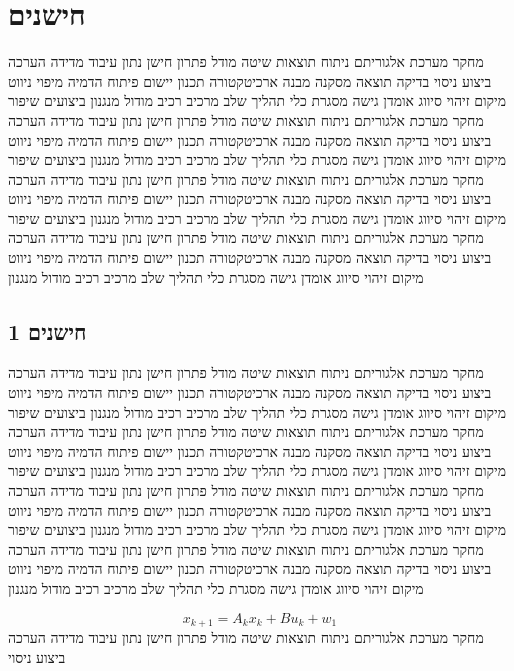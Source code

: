 \section{חישנים}
\label{sec:ch03}

מחקר מערכת אלגוריתם ניתוח תוצאות שיטה מודל פתרון חישן נתון עיבוד מדידה הערכה ביצוע ניסוי בדיקה תוצאה מסקנה מבנה ארכיטקטורה תכנון יישום פיתוח הדמיה מיפוי ניווט מיקום זיהוי סיווג אומדן גישה מסגרת כלי תהליך שלב מרכיב רכיב מודול מנגנון ביצועים שיפור מחקר מערכת אלגוריתם ניתוח תוצאות שיטה מודל פתרון חישן נתון עיבוד מדידה הערכה ביצוע ניסוי בדיקה תוצאה מסקנה מבנה ארכיטקטורה תכנון יישום פיתוח הדמיה מיפוי ניווט מיקום זיהוי סיווג אומדן גישה מסגרת כלי תהליך שלב מרכיב רכיב מודול מנגנון ביצועים שיפור מחקר מערכת אלגוריתם ניתוח תוצאות שיטה מודל פתרון חישן נתון עיבוד מדידה הערכה ביצוע ניסוי בדיקה תוצאה מסקנה מבנה ארכיטקטורה תכנון יישום פיתוח הדמיה מיפוי ניווט מיקום זיהוי סיווג אומדן גישה מסגרת כלי תהליך שלב מרכיב רכיב מודול מנגנון ביצועים שיפור מחקר מערכת אלגוריתם ניתוח תוצאות שיטה מודל פתרון חישן נתון עיבוד מדידה הערכה ביצוע ניסוי בדיקה תוצאה מסקנה מבנה ארכיטקטורה תכנון יישום פיתוח הדמיה מיפוי ניווט מיקום זיהוי סיווג אומדן גישה מסגרת כלי תהליך שלב מרכיב רכיב מודול מנגנון

\subsection{חישנים 1}
\label{sub:ch03_1}
מחקר מערכת אלגוריתם ניתוח תוצאות שיטה מודל פתרון חישן נתון עיבוד מדידה הערכה ביצוע ניסוי בדיקה תוצאה מסקנה מבנה ארכיטקטורה תכנון יישום פיתוח הדמיה מיפוי ניווט מיקום זיהוי סיווג אומדן גישה מסגרת כלי תהליך שלב מרכיב רכיב מודול מנגנון ביצועים שיפור מחקר מערכת אלגוריתם ניתוח תוצאות שיטה מודל פתרון חישן נתון עיבוד מדידה הערכה ביצוע ניסוי בדיקה תוצאה מסקנה מבנה ארכיטקטורה תכנון יישום פיתוח הדמיה מיפוי ניווט מיקום זיהוי סיווג אומדן גישה מסגרת כלי תהליך שלב מרכיב רכיב מודול מנגנון ביצועים שיפור מחקר מערכת אלגוריתם ניתוח תוצאות שיטה מודל פתרון חישן נתון עיבוד מדידה הערכה ביצוע ניסוי בדיקה תוצאה מסקנה מבנה ארכיטקטורה תכנון יישום פיתוח הדמיה מיפוי ניווט מיקום זיהוי סיווג אומדן גישה מסגרת כלי תהליך שלב מרכיב רכיב מודול מנגנון ביצועים שיפור מחקר מערכת אלגוריתם ניתוח תוצאות שיטה מודל פתרון חישן נתון עיבוד מדידה הערכה ביצוע ניסוי בדיקה תוצאה מסקנה מבנה ארכיטקטורה תכנון יישום פיתוח הדמיה מיפוי ניווט מיקום זיהוי סיווג אומדן גישה מסגרת כלי תהליך שלב מרכיב רכיב מודול מנגנון

\begin{equation}
    x_{k+1} = A_{k} x_k + B u_{k} + w_{1}
    \label{eq:ch03_1}
\end{equation}
מחקר מערכת אלגוריתם ניתוח תוצאות שיטה מודל פתרון חישן נתון עיבוד מדידה הערכה ביצוע ניסוי


